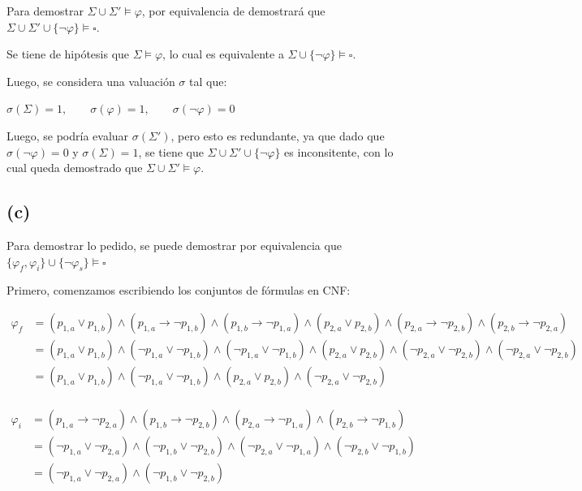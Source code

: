 \documentclass[12pt]{article}
\begin{document}
Para demostrar $\Sigma \cup \Sigma' \vDash \varphi$, por equivalencia de demostrará que 
$\Sigma \cup \Sigma' \cup  \{\neg \varphi\} \vDash \square$.

Se tiene de hipótesis que $\Sigma \vDash \varphi$, lo cual es equivalente a $\Sigma \cup \{\neg \varphi\} \vDash \square$.

Luego, se considera una valuación $\sigma$ tal que:
\begin{center}
    $\sigma(\Sigma) = 1, \qquad \sigma(\varphi) = 1, \qquad \sigma(\neg \varphi) = 0$
\end{center}

Luego, se podría evaluar $\sigma(\Sigma')$, pero esto es redundante, ya que dado que $\sigma(\neg \varphi) = 0$ y $\sigma(\Sigma) = 1$,
se tiene que $\Sigma \cup \Sigma' \cup \{\neg \varphi\}$ es inconsitente, con lo cual queda demostrado que $\Sigma \cup \Sigma' \vDash \varphi$.

\newpage
\subsection*{(c)}

Para demostrar lo pedido, se puede demostrar por equivalencia que $\{\varphi_f, \varphi_i\} \cup \{\neg \varphi_s\} \vDash \square$

Primero, comenzamos escribiendo los conjuntos de fórmulas en CNF:

\begin{align*}
    \varphi_f
    &= (p_{1,a} \lor p_{1,b}) \land (p_{1,a} \rightarrow \neg p_{1,b}) \land (p_{1,b} \rightarrow \neg p_{1,a})
    \land (p_{2,a} \lor p_{2,b}) \land (p_{2,a} \rightarrow \neg p_{2,b}) \land (p_{2,b} \rightarrow \neg p_{2,a}) \\
    &= (p_{1,a} \lor p_{1,b}) \land (\neg p_{1,a} \lor  \neg p_{1,b}) \land (\neg p_{1,a} \lor  \neg p_{1,b}) \land
    (p_{2,a} \lor p_{2,b}) \land  (\neg p_{2,a} \lor \neg p_{2,b}) \land (\neg p_{2,a} \lor \neg p_{2,b}) \\
    &= (p_{1,a} \lor p_{1,b}) \land (\neg p_{1,a} \lor \neg p_{1,b}) \land (p_{2,a} \lor p_{2,b}) \land (\neg p_{2,a} \lor \neg p_{2,b}) \\
\end{align*}

\begin{align*}
    \varphi_i
    &= (p_{1,a} \rightarrow \neg p_{2,a}) \land (p_{1,b} \rightarrow \neg p_{2,b}) \land (p_{2,a} \rightarrow \neg p_{1,a}) \land (p_{2,b} \rightarrow \neg p_{1,b}) \\
    &= (\neg p_{1,a} \lor \neg p_{2,a}) \land (\neg p_{1,b} \lor \neg p_{2,b}) \land (\neg p_{2,a} \lor \neg p_{1,a}) \land (\neg p_{2,b} \lor \neg p_{1,b}) \\
    &= (\neg p_{1,a} \lor \neg p_{2,a}) \land (\neg p_{1,b} \lor \neg p_{2,b})
\end{align*}
\end{document}
